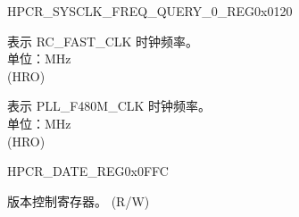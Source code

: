 \begin{register}{H}{PCR\_SYSCLK\_FREQ\_QUERY\_0\_REG}{0x0120}\label{regdesc:PCRSYSCLKFREQQUERY0REG}
%
%
%
\regnewline%
\begin{regdesc}\begin{reglist}
\label{fielddesc:PCRFOSCFREQ}\item [PCR\_FOSC\_FREQ] 表示 RC\_FAST\_CLK 时钟频率。\\
单位：MHz\\ (HRO)
\label{fielddesc:PCRPLLFREQ}\item [PCR\_PLL\_FREQ] 表示 PLL\_F480M\_CLK 时钟频率。\\
单位：MHz\\(HRO)
\end{reglist}\end{regdesc}
\end{register}


\begin{register}{H}{PCR\_DATE\_REG}{0x0FFC}\label{regdesc:PCRDATEREG}
%
%
\regnewline%
\begin{regdesc}\begin{reglist}
\label{fielddesc:PCRDATE}\item [PCR\_DATE] 版本控制寄存器。 (R/W)
\end{reglist}\end{regdesc}
\end{register}
